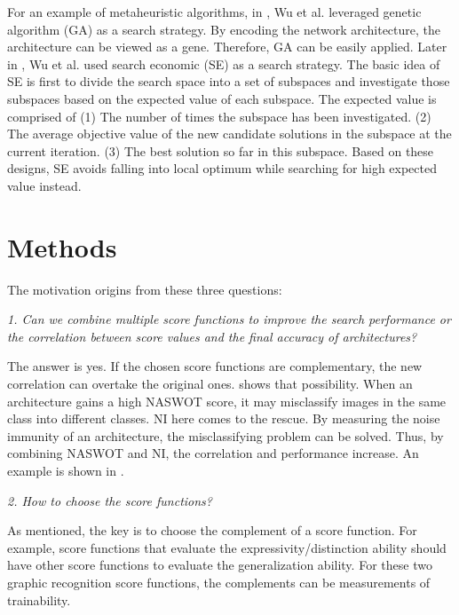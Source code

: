 \documentclass[sigconf]{acmart}
\begin{document}
    For an example of metaheuristic algorithms, in \cite{10.1145/3491396.3506510}, Wu et al. leveraged 
    genetic algorithm (GA) as a search strategy. 
    By encoding the network architecture, the architecture can be viewed as a gene. Therefore, GA can be 
    easily applied. 
    Later in \cite{10092788}, Wu et al. used search economic (SE) \cite{7379579} as a search strategy. The 
    basic idea of SE is first to divide the search space into a set of subspaces and investigate those 
    subspaces based on the expected value of each subspace. The expected value is comprised of 
    (1) The number of times the subspace has been investigated. 
    (2) The average objective value of the new candidate solutions in the subspace at the current iteration. 
    (3) The best solution so far in this subspace. 
    Based on these designs, SE avoids falling into local optimum while searching for high expected value instead. 
    
    \section{Methods}
    \label{sec:proposed}
    
    The motivation origins from these three questions: 

    \textit{1. Can we combine multiple score functions to improve the search performance 
    or the correlation between score values and the final accuracy of architectures?}
    
    The answer is yes. If the chosen score functions are complementary, the new correlation 
    can overtake the original ones. \cite{10.1145/3491396.3506510} 
    shows that possibility. When an architecture gains a high NASWOT score, 
    it may misclassify images in the same class into different classes. NI here comes 
    to the rescue. By measuring the noise immunity of an architecture, the misclassifying problem 
    can be solved. Thus, by combining NASWOT and NI, the correlation and performance increase. 
    An example is shown in .

    \textit{2. How to choose the score functions?}

    As mentioned, the key is to choose the complement of a score function. For example, 
    score functions that evaluate the expressivity/distinction ability should have other 
    score functions to evaluate the generalization ability. For these two graphic recognition 
    score functions, the complements can be measurements of trainability. 
\end{document}
